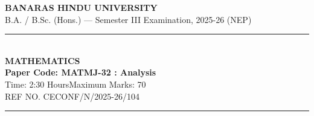 \documentclass[11pt,a4paper]{article}
\begin{document}
\begin{center}
  {\large\bfseries BANARAS HINDU UNIVERSITY}\\[2pt]
  {\normalsize B.A. / B.Sc. (Hons.) --- Semester III Examination, 2025-26 (NEP)}\\[6pt]
  \rule{0.8\linewidth}{0.5pt}\\[6pt]
  {\large\bfseries MATHEMATICS}\\[4pt]
  {\large\bfseries Paper Code: MATMJ-32 : Analysis}\\[4pt]
  {\normalsize Time: 2:30 Hours\hfill Maximum Marks: 70}\\[2pt]
  {\small REF NO. CECONF/N/2025-26/104}
\end{center}

\rule{\linewidth}{0.4pt}

\smallskip
\end{document}
